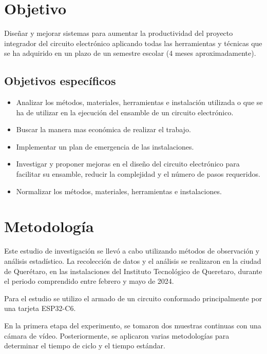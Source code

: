    \section{Objetivo}
    Diseñar y mejorar sistemas para aumentar la productividad del proyecto integrador del circuito electrónico aplicando todas las herramientas y técnicas que se ha adquirido en un plazo de un semestre escolar (4 meses aproximadamente).
    
    \subsection{Objetivos específicos }
    
    \begin{itemize}
        \item Analizar los métodos, materiales, herramientas e instalación utilizada o que se ha de utilizar en la ejecución del ensamble de un circuito electrónico.
        \item Buscar la manera mas económica de realizar el trabajo.
        \item Implementar un plan de emergencia de las instalaciones.
        \item Investigar y proponer mejoras en el diseño del circuito electrónico para facilitar su ensamble, reducir la complejidad y el número de pasos requeridos.
        \item Normalizar los métodos, materiales, herramientas e instalaciones.
        
    
    \end{itemize}
    
    \section{Metodología} %
    
    Este estudio de investigación se llevó a cabo utilizando métodos de observación y análisis estadístico. La recolección de datos y el análisis se realizaron en la ciudad de Querétaro, en las instalaciones del Instituto Tecnológico de Queretaro, durante el periodo comprendido entre febrero y mayo de 2024.
    
    Para el estudio se utilizo el armado de un circuito  conformado principalmente por una tarjeta ESP32-C6.
    
    En la primera etapa del experimento, se tomaron dos muestras continuas con una cámara de vídeo. Posteriormente, se aplicaron varias metodologías para determinar el tiempo de ciclo y el tiempo estándar.
    
